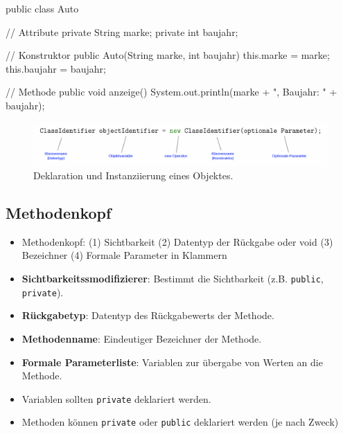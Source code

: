 \documentclass[a4paper,10pt, dvipsnames]{report}
\newcommand{\javaInLine}[1]{\texttt{#1}}
\begin{document}
\begin{javacodebox}
    public class Auto {
        // Attribute
        private String marke;
        private int baujahr;
    
        // Konstruktor
        public Auto(String marke, int baujahr) {
            this.marke = marke;
            this.baujahr = baujahr;
        }
    
        // Methode
        public void anzeige() {
            System.out.println(marke + ", Baujahr: " + baujahr);
        }
    }
\end{javacodebox}

\begin{figure}
    \centering
    \includegraphics[width=0.75\linewidth]{resources/ObjektDeklarierungUndInstanziierung.png}
    \caption{Deklaration und Instanziierung eines Objektes.}
    \label{fig:deklaration-und-instanziierung}
\end{figure}



\subsection{Methodenkopf}

\begin{itemize}
    \item Methodenkopf: (1) Sichtbarkeit (2) Datentyp der Rückgabe oder void (3) Bezeichner (4) Formale Parameter in Klammern
    \item \textbf{Sichtbarkeitssmodifizierer}: Bestimmt die Sichtbarkeit (z.B. \javaInLine{public}, \javaInLine{private}).
    \item \textbf{Rückgabetyp}: Datentyp des Rückgabewerts der Methode.
    \item \textbf{Methodenname}: Eindeutiger Bezeichner der Methode.
    \item \textbf{Formale Parameterliste}: Variablen zur übergabe von Werten an die Methode.
    \item Variablen sollten \javaInLine{private} deklariert werden.
    \item Methoden können \javaInLine{private} oder \javaInLine{public} deklariert werden (je nach Zweck)
\end{itemize}
\end{document}
